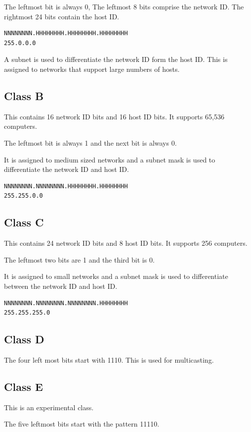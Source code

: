 The leftmost bit is always 0, The leftmost 8 bits comprise the network ID. The rightmost 24 bits contain the host ID.
\begin{verbatim}
NNNNNNNN.HHHHHHHH.HHHHHHHH.HHHHHHHH
255.0.0.0
\end{verbatim}
A subnet is used to differentiate the network ID form the host ID. This is assigned to networks that support large numbers of hosts.

\subsection*{Class B}
This contains 16 network ID bits and 16 host ID bits. It supports 65,536 computers.

The leftmost bit is always 1 and the next bit is always 0.

It is assigned to medium sized networks and a subnet mask is used to differentiate the network ID and host ID.

\begin{verbatim}
NNNNNNNN.NNNNNNNN.HHHHHHHH.HHHHHHHH
255.255.0.0
\end{verbatim}

\subsection*{Class C}
This contains 24 network ID bits and 8 host ID bits. It supports 256 computers.

The leftmost two bits are 1 and the third bit is 0.

It is assigned to small networks and a subnet mask is used to differentiate between the network ID and host ID.
\begin{verbatim}
NNNNNNNN.NNNNNNNN.NNNNNNNN.HHHHHHHH
255.255.255.0
\end{verbatim}

\subsection*{Class D}
The four left most bits start with 1110. This is used for multicasting.

\subsection*{Class E}
This is an experimental class.

The five leftmost bits start with the pattern 11110.